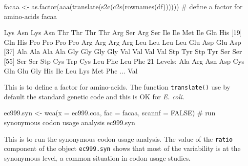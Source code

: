 \documentclass{article}
\begin{document}
\begin{Schunk}
\begin{Sinput}
 facaa <- as.factor(aaa(translate(s2c(c2s(rownames(df)))))) # define a factor for amino-acids
 facaa
\end{Sinput}
\begin{Soutput}
 [1] Lys Asn Lys Asn Thr Thr Thr Thr Arg Ser Arg Ser Ile Ile Met Ile Gln His
[19] Gln His Pro Pro Pro Pro Arg Arg Arg Arg Leu Leu Leu Leu Glu Asp Glu Asp
[37] Ala Ala Ala Ala Gly Gly Gly Gly Val Val Val Val Stp Tyr Stp Tyr Ser Ser
[55] Ser Ser Stp Cys Trp Cys Leu Phe Leu Phe
21 Levels: Ala Arg Asn Asp Cys Gln Glu Gly His Ile Leu Lys Met Phe ... Val
\end{Soutput}
\end{Schunk}

This is to define a factor for amino-acids. The function \texttt{translate()} use by
default the standard genetic code and this is OK for \textit{E. coli}.

\begin{Schunk}
\begin{Sinput}
 ec999.syn <- wca(x = ec999.coa, fac = facaa, scannf = FALSE) # run synonymous codon usage analysis
 ec999.syn
\end{Sinput}
\end{Schunk}

This is to run the synonymous codon usage analysis. The value of the \texttt{ratio} component of
the object \texttt{ec999.syn} shows that most of the variability is at the synonymous
level, a common situation in codon usage studies.
\end{document}
